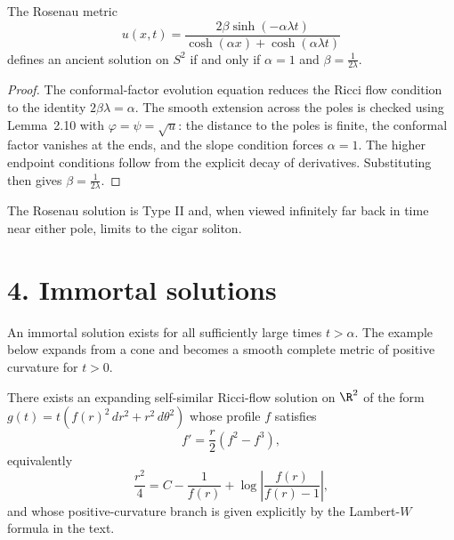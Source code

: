 \begin{lemma}
\label{ch02-lem-rosenau-sphere}

The Rosenau metric
\[
u(x,t)=\frac{2\beta\sinh(-\alpha\lambda t)}{\cosh(\alpha x)+\cosh(\alpha\lambda t)}
\]
defines an ancient solution on \(S^2\) if and only if \(\alpha=1\) and
\(\beta=\frac{1}{2\lambda}\).
\end{lemma}

\begin{proof}
\sketch The conformal-factor evolution equation reduces the Ricci flow condition to the
identity \(2\beta\lambda=\alpha\). The smooth extension across the poles is
checked using Lemma~2.10 with \(\varphi=\psi=\sqrt{u}\): the distance to the
poles is finite, the conformal factor vanishes at the ends, and the slope
condition forces \(\alpha=1\). The higher endpoint conditions follow from the
explicit decay of derivatives. Substituting then gives \(\beta=\frac1{2\lambda}\).
\end{proof}

\begin{remark}
\label{ch02-rem-rosenau-limit-cigar}

The Rosenau solution is Type II and, when viewed infinitely far back in time
near either pole, limits to the cigar soliton.
\end{remark}

\section*{4. Immortal solutions}

An immortal solution exists for all sufficiently large times \(t>\alpha\). The
example below expands from a cone and becomes a smooth complete metric of
positive curvature for \(t>0\).

\begin{lemma}
\label{ch02-lem-expanding-cone-soliton}

There exists an expanding self-similar Ricci-flow solution on \(\R^2\) of the
form \(g(t)=t(f(r)^2\,dr^2+r^2\,d\theta^2)\) whose profile \(f\) satisfies
\[
f'=\frac r2(f^2-f^3),
\]
equivalently
\[
\frac{r^2}{4}=C-\frac1{f(r)}+\log\left|\frac{f(r)}{f(r)-1}\right|,
\]
and whose positive-curvature branch is given explicitly by the Lambert-\(W\)
formula in the text.
\end{lemma}

